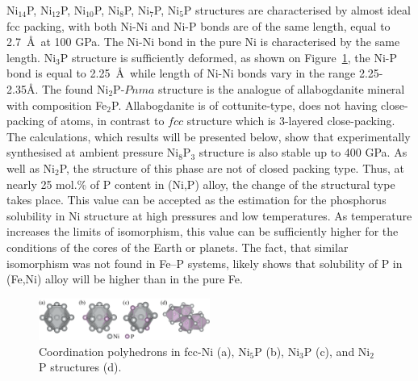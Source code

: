 \documentclass[twoside,twocolumn,9pt]{article}
\begin{document}
Ni$_{14}$P, Ni$_{12}$P, Ni$_{10}$P, Ni$_8$P, Ni$_7$P, Ni$_5$P structures are characterised by almost ideal fcc packing, with both Ni-Ni and Ni-P bonds are of the same length, equal to 2.7~\AA\ at 100 GPa.
The Ni-Ni bond in the pure Ni is characterised by the same length.
Ni$_3$P structure is sufficiently deformed, as shown on Figure~\ref{f:strs}, the Ni-P bond is equal to 2.25~\AA\, while length of Ni-Ni bonds vary in the range 2.25-2.35\AA.
The found Ni$_2$P-$Pnma$ structure is the analogue of allabogdanite mineral with composition Fe$_2$P.
Allabogdanite is of cottunite-type, does not having close-packing of atoms, in contrast to $fcc$ structure which is 3-layered close-packing.
The calculations, which results will be presented below, show that experimentally synthesised at ambient pressure Ni$_8$P$_3$ structure is also stable up to 400 GPa.
As well as Ni$_2$P, the structure of this phase are not of closed packing type.
Thus, at nearly 25 mol.\% of P content in (Ni,P) alloy, the change of the structural type takes place.
This value can be accepted as the estimation for the phosphorus solubility in Ni structure at high pressures and low temperatures.
As temperature increases the limits of isomorphism, this value can be sufficiently higher for the conditions of the cores of the Earth or planets.
The fact, that similar isomorphism was not found in Fe--P systems, likely shows that solubility of P in (Fe,Ni) alloy will be higher than in the pure Fe.

\begin{figure}
	\includegraphics[width=0.5\textwidth]{str_ss.png}
	\caption{Coordination polyhedrons in fcc-Ni (a), Ni$_5$P (b), Ni$_3$P (c), and Ni$_2$P structures (d).}\label{f:strs}
\end{figure}

\end{document}
